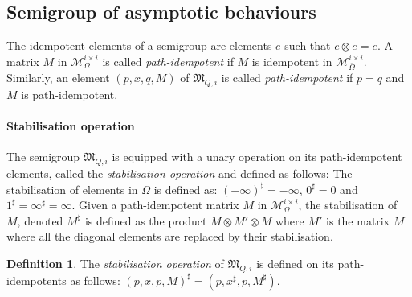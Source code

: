 \documentclass[10pt,a4paper]{amsart}
\theoremstyle{definition}
\newtheorem{defi}[defi]{Definition}
\numberwithin{equation}{section}
\theoremstyle{remark}
\newcommand{\matricesOm}[2]{\mathcal{M}^{#1 \times #2}_\Omega}
\newcommand{\ideal}{\mathfrak{M}}
\newcommand{\matricesOmbar}[2]{\mathcal{M}_{\overline{\Omega}}^{#1\times #2}}
\theoremstyle{remark}
\begin{document}
\subsection{Semigroup of asymptotic behaviours}

The idempotent elements of a semigroup are elements $e$ such that $e\otimes e=e$. A matrix $M$ in $\matricesOm{i}{i}$ is called \emph{path-idempotent} if $\overline{M}$ is idempotent in $\matricesOmbar{i}{i}$. Similarly, an element $(p,x,q,M)$ of $\ideal_{Q,i}$ is called \emph{path-idempotent} if $p=q$ and $M$ is path-idempotent.

\paragraph*{Stabilisation operation}
The semigroup $\ideal_{Q,i}$ is equipped with a unary operation on its path-idempotent elements, called the \emph{stabilisation operation} and defined as follows: The stabilisation of elements in $\Omega$ is defined as: $(-\infty)^\sharp = -\infty$, $0^\sharp = 0$ and $1^\sharp = \infty^\sharp = \infty$. 
Given a path-idempotent matrix $M$ in $\matricesOm{i}{i}$, the stabilisation of $M$, denoted $M^\sharp$ is defined as the product $M\otimes M' \otimes M$ where $M'$ is the matrix $M$ where all the diagonal elements are replaced by their stabilisation.

\begin{defi}\label{def:op:stab}
The \emph{stabilisation operation} of $\ideal_{Q,i}$ is defined on its path-idempotents as follows: $(p,x,p,M)^\sharp = (p,x^\sharp,p,M^\sharp)$.
\end{defi}
\end{document}
